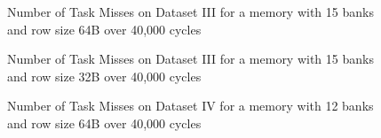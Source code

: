 \begin{figure}
\centering
{}
\caption{Number of Task Misses on Dataset III for a memory with 15 banks and row size 64B over 40,000 cycles}
\end{figure}

\begin{figure}
\centering
{}
\caption{Number of Task Misses on Dataset III for a memory with 15 banks and row size 32B over 40,000 cycles}
\end{figure}

\begin{figure}
\centering
{}
\caption{Number of Task Misses on Dataset IV for a memory with 12 banks and row size 64B over 40,000 cycles}
\end{figure}

